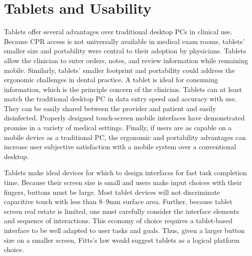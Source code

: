 \documentclass[11pt]{article}
\begin{document}
\section{Tablets and Usability}
Tablets offer several advantages over traditional desktop PCs in clinical use. Because CPR access is not universally available in medical exam rooms, tablets' smaller size and portability were central to their adoption by physicians. Tablets allow the clinician to enter orders, notes, and review information while remaining mobile. Similarly, tablets' smaller footprint and portability could address the ergonomic challenges in dental practice. A tablet is ideal for consuming information, which is the principle concern of the clinician. Tablets can at least match the traditional desktop PC in data entry speed and accuracy with use\cite{Kirby1996The-PEN--PAD-da,Mackenzi2002Text-entry-for-}. They can be easily shared between the provider and patient and easily disinfected\cite{Mayrhofer2007Pen-based-Elect}. Properly designed touch-screen mobile interfaces have demonstrated promise in a variety of medical settings\cite{Haller2009Handheld-vs.-la,Mulligen1998Clinical-data-e,Baumgart2005Personal-digita,Lu2005A-review-and-a-,Seneviratne2010Improving-stylu}. Finally, if users are as capable on a mobile device as a traditional PC, the ergonomic and portability advantages can increase user subjective satisfaction with a mobile system over a conventional desktop\cite{Cole2006A-comparative-s}.

Tablets make ideal devices for which to design interfaces for fast task completion time. Because their screen size is small and users make input choices with their fingers, buttons must be large. Most tablet devices will not discriminate capacitive touch with less than 8--9mm surface area. Further, because tablet screen real estate is limited, one must carefully consider the interface elements and sequence of interactions. This economy of choice requires a tablet-based interface to be well adapted to user tasks and goals. Thus, given a larger button size on a smaller screen, Fitts's law would suggest tablets as a logical platform choice.
\end{document}
